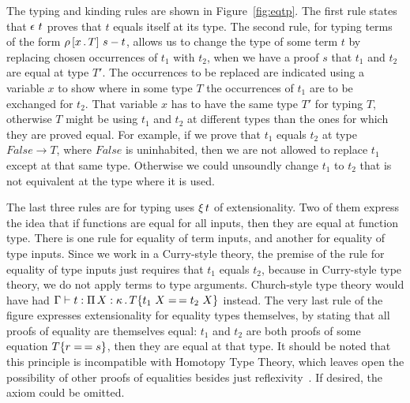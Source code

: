 \documentclass{article}
\begin{document}
The typing and kinding rules are shown in
Figure~\ref{fig:eqtp}.  The first rule states that $\rfl{t}$ proves
that $t$ equals itself at its type.  The second rule, for typing
terms of the form $\cng{x}{T}{s}{t}$, allows us
to change the type of some term $t$ by replacing chosen occurrences
of $t_1$ with $t_2$, when we have a proof $s$ that $t_1$ and $t_2$
are equal at type $T'$.  The occurrences to be replaced are indicated
using a variable $x$ to show where in some type $T$ the occurrences
of $t_1$ are to be exchanged for $t_2$.  That variable $x$ has to
have the same type $T'$ for typing $T$, otherwise $T$ might be using
$t_1$ and $t_2$ at different types than the ones for which they are
proved equal.  For example, if we prove that $t_1$ equals $t_2$ at type
$\textit{False} \to T$, where $\textit{False}$ is uninhabited, then
we are not allowed to replace $t_1$ except at that same type.  Otherwise
we could unsoundly change $t_1$ to $t_2$ that is not equivalent at the
type where it is used.

The last three rules are for typing uses $\ext{t}$ of extensionality.
Two of them express the idea that if functions are equal for all
inputs, then they are equal at function type.  There is one rule for
equality of term inputs, and another for equality of type inputs.
Since we work in a Curry-style theory, the premise of the rule for
equality of type inputs just requires that $t_1$ equals $t_2$, because
in Curry-style type theory, we do not apply terms to type arguments.
Church-style type theory would have had $\Gamma \vdash t :
\Pia{X}{\kappa}{\eqtm{t_1\ X}{T}{t_2\ X}}$ instead.  The very last
rule of the figure expresses extensionality for equality types
themselves, by stating that all proofs of equality are themselves
equal: $t_1$ and $t_2$ are both proofs of some equation
$\eqtm{r}{T}{s}$, then they are equal at that type.  It should be
noted that this principle is incompatible with Homotopy Type Theory,
which leaves open the possibility of other proofs of equalities
besides just reflexivity~\cite{hottbook}.  If desired, the axiom could
be omitted.
\end{document}
